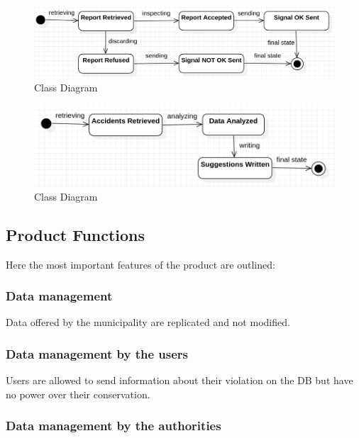 \begin{figure}
\centering
\includegraphics[width=\textwidth]{Images/Diagrams/State-2.png}
\caption{\label{fig:UML}Class Diagram}
\end{figure}

\begin{figure}
\centering
\includegraphics[width=\textwidth]{Images/Diagrams/State-3.png}
\caption{\label{fig:UML}Class Diagram}
\end{figure}

\newpage


\subsection{Product Functions}

Here the most important features of the product are outlined:

\subsubsection{Data management}

Data offered by the municipality are replicated and not modified.

\subsubsection*{Data management by the users}

Users are allowed to send information about their violation on the DB but have no power over their conservation. 

\subsubsection*{Data management by the authorities}


